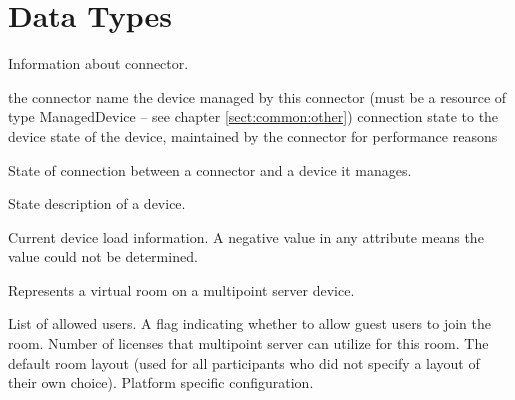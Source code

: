 \section{Data Types}

\begin{Api}

Information about connector.
\begin{ApiClassAttributes}
 the connector name
 the device managed by this connector (must be a resource of type ManagedDevice -- see chapter \ref{sect:common:other})
 connection state to the device
 state of the device, maintained by the connector for performance reasons
\end{ApiClassAttributes}

State of connection between a connector and a device it manages.
\begin{ApiEnumValues}
\end{ApiEnumValues}

State description of a device.
\todo{}

Current device load information. A negative value in any attribute means the value could not be determined.
\begin{ApiClassAttributes}
\end{ApiClassAttributes}

Represents a virtual room on a multipoint server device.
\begin{ApiClassAttributes}
 List of allowed users.
 A flag indicating whether to allow guest users to join the room.
 Number of licenses that multipoint server can utilize for this room.
 The default room layout (used for all participants who did not specify a layout of their own choice).
 Platform specific configuration.
\end{ApiClassAttributes}


\end{Api}
